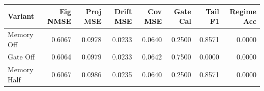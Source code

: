 \begin{tabular}{lrrrrrrr}
\toprule
Variant & Eig NMSE & Proj MSE & Drift MSE & Cov MSE & Gate Cal & Tail F1 & Regime Acc \\
\midrule
Memory Off & 0.6067 & 0.0978 & 0.0233 & 0.0640 & 0.2500 & 0.8571 & 0.0000 \\
Gate Off & 0.6064 & 0.0979 & 0.0233 & 0.0642 & 0.7500 & 0.0000 & 0.0000 \\
Memory Half & 0.6067 & 0.0986 & 0.0235 & 0.0640 & 0.2500 & 0.8571 & 0.0000 \\
\bottomrule
\end{tabular}